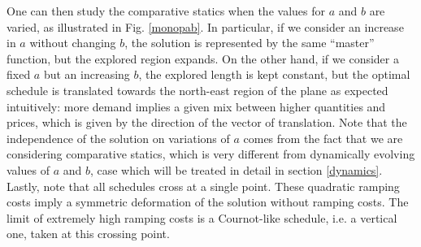 One can then study the comparative statics when the values for $a$ and $b$ are varied, as illustrated in Fig. \ref{monopab}. In particular, if we consider an increase in $a$ without changing $b$, the solution is represented by the same ``master'' function, but the explored region expands. On the other hand, if we consider a fixed $a$ but an increasing $b$, the explored length is kept constant, but the optimal schedule is translated towards the north-east region of the plane as expected intuitively: more demand implies a given mix between higher quantities and prices, which is given by the direction of the vector of translation. Note that the independence of the solution on variations of $a$ comes from the fact that we are considering comparative statics, which is very different from dynamically evolving values of $a$ and $b$, case which will be treated in detail in section \ref{dynamics}.  \\

Lastly, note that all schedules cross at a single point. These quadratic ramping costs imply a symmetric deformation of the solution without ramping costs. The limit of extremely high ramping costs is a Cournot-like schedule, i.e. a vertical one, taken at this crossing point. 

